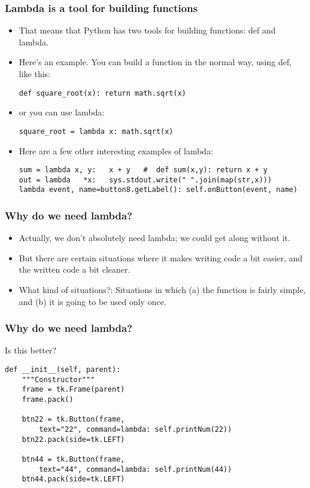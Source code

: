 \begin{frame}[fragile]\frametitle{Lambda is a tool for building functions}

    \begin{itemize}
    \item That means that Python has two tools for building functions: def and lambda.
    \item Here's an example. You can build a function in the normal way, using def, like this:
        \begin{lstlisting}
def square_root(x): return math.sqrt(x)
\end{lstlisting}
\item or you can use lambda:
        \begin{lstlisting}
square_root = lambda x: math.sqrt(x)
\end{lstlisting}
\item Here are a few other interesting examples of lambda:
        \begin{lstlisting}
sum = lambda x, y:   x + y   #  def sum(x,y): return x + y
out = lambda   *x:   sys.stdout.write(" ".join(map(str,x)))
lambda event, name=button8.getLabel(): self.onButton(event, name)
\end{lstlisting}
    \end{itemize}

\end{frame}


\begin{frame}[fragile]\frametitle{Why do we need lambda?}

    \begin{itemize}
    \item  Actually, we don't absolutely need lambda; we could get along without it. 
    \item But there are certain situations where it makes writing code a bit easier, and the written code a bit cleaner. 
    \item What kind of situations?: Situations in which (a) the function is fairly simple, and (b) it is going to be used only once.
    \end{itemize}

\end{frame}

\begin{frame}[fragile]\frametitle{Why do we need lambda?}

Is this better?
        \begin{lstlisting}
def __init__(self, parent):
    """Constructor"""
    frame = tk.Frame(parent)
    frame.pack()
 
    btn22 = tk.Button(frame,
        text="22", command=lambda: self.printNum(22))
    btn22.pack(side=tk.LEFT)
 
    btn44 = tk.Button(frame,
        text="44", command=lambda: self.printNum(44))
    btn44.pack(side=tk.LEFT)
\end{lstlisting}

\end{frame}


